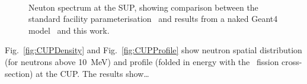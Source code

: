 \documentclass[11pt,a4paper]{IEEEtran}
\let\MYoriglatexcaption\caption
\renewcommand{\caption}[2][\relax]{\MYoriglatexcaption[#2]{#2}}
\def\U238{\BPChem{\^{238}U}}
\begin{document}
\begin{figure}[t]
	\\
	\caption{Neuton spectrum at the SUP, showing comparison between the standard facility parameterisation~\cite{Prokofiev2009} and results from a naked Geant4 model~\cite{Platt13} and this work.}
	\label{fig:SUPSpectraComparison}
\end{figure}

Fig.~\ref{fig:CUPDensity} and Fig.~\ref{fig:CUPProfile} show neutron spatial distribution (for neutrons above \SI{10}{\MeV}) and profile (folded in energy with the \U238\ fission cross-section) at the CUP.
The results show\ldots{}
\end{document}
